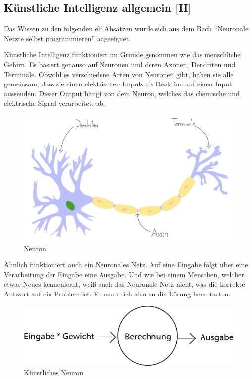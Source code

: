 \subsection{Künstliche Intelligenz allgemein [H]}\label{tech:ki:head}
Das Wissen zu den folgenden elf Absätzen wurde sich aus dem Buch ``Neuronale Netzte selbst programmieren'' angeeignet. \cite{nnselbst}

Künstliche Intelligenz funktioniert im Grunde genommen wie das menschliche Gehirn. Es basiert genauso auf Neuronen und deren Axonen, Dendriten und Terminale. Obwohl es verschiedene Arten von Neuronen gibt, haben sie alle gemeinsam, dass sie einen elektrischen Impuls als Reaktion auf einen Input aussenden. Dieser Output hängt von dem Neuron, welches das chemische und elektrische Signal verarbeitet, ab.

\begin{figure}[H]
  \centering
  \includegraphics[scale=0.15]{pics/Neuron.jpeg}
  \caption{Neuron \cite{tech:neuron:cite}}
  \label{fig:tech:Neuron}
\end{figure}

Ähnlich funktioniert auch ein Neuronales Netz. Auf eine Eingabe folgt über eine Verarbeitung der Eingabe eine Ausgabe. Und wie bei einem Menschen, welcher etwas Neues kennenlernt, weiß auch das Neuronale Netz nicht, was die korrekte Antwort auf ein Problem ist. Es muss sich also an die Lösung herantasten.

\begin{figure}[H]
  \centering
  \includegraphics[scale=0.3]{pics/eba.png}
  \caption{Künstliches Neuron}
  \label{fig:tech:eba}
\end{figure}

